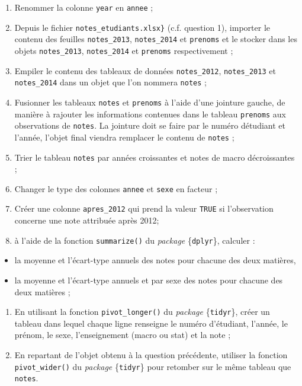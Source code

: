 \documentclass[
  11pt,
]{book}
\makeatletter
\providecommand{\tightlist}{%
  \setlength{\itemsep}{0pt}\setlength{\parskip}{0pt}}
\numberwithin{equation}{section}
\numberwithin{countremarque}{section}
\newenvironment{exframe}{%
 \def\at@end@of@exframe{}%
 \ifinner\ifhmode%
  \def\at@end@of@exframe{\end{minipage}}%
  \begin{minipage}{\columnwidth}%
 \fi\fi%
 \def\FrameCommand##1{\hskip\@totalleftmargin \hskip-\fboxsep
 \colorbox{shadecolorex}{##1}\hskip-\fboxsep
     \hskip-\linewidth \hskip-\@totalleftmargin \hskip\columnwidth}%
 \MakeFramed {\advance\hsize-\width
   \@totalleftmargin\z@ \linewidth\hsize
   \@setminipage}}%
 {\par\unskip\endMakeFramed%
 \at@end@of@exframe}
\makeatother
\begin{document}
\begin{exframe}
\begin{enumerate}
\def\labelenumi{\arabic{enumi}.}
\setcounter{enumi}{9}
\tightlist
\item
  Renommer la colonne \texttt{year} en \texttt{annee} ;
\item
  Depuis le fichier \texttt{notes\_etudiants.xlsx\}} (c.f. question 1), importer le contenu des feuilles \texttt{notes\_2013}, \texttt{notes\_2014} et \texttt{prenoms} et le stocker dans les objets \texttt{notes\_2013}, \texttt{notes\_2014} et \texttt{prenoms} respectivement ;
\item
  Empiler le contenu des tableaux de données \texttt{notes\_2012}, \texttt{notes\_2013} et \texttt{notes\_2014} dans un objet que l'on nommera \texttt{notes} ;
\item
  Fusionner les tableaux \texttt{notes} et \texttt{prenoms} à l'aide d'une jointure gauche, de manière à rajouter les informations contenues dans le tableau \texttt{prenoms} aux observations de \texttt{notes}. La jointure doit se faire par le numéro détudiant et l'année, l'objet final viendra remplacer le contenu de \texttt{notes} ;
\item
  Trier le tableau \texttt{notes} par années croissantes et notes de macro décroissantes ;
\item
  Changer le type des colonnes \texttt{annee} et \texttt{sexe} en facteur ;
\item
  Créer une colonne \texttt{apres\_2012} qui prend la valeur \texttt{TRUE} si l'observation concerne une note attribuée après 2012;
\item
  à l'aide de la fonction \texttt{summarize()} du \emph{package} \{\texttt{dplyr}\}, calculer :
\end{enumerate}

\begin{itemize}
\tightlist
\item
  la moyenne et l'écart-type annuels des notes pour chacune des deux matières,
\item
  la moyenne et l'écart-type annuels et par sexe des notes pour chacune des deux matières ;
\end{itemize}

\begin{enumerate}
\def\labelenumi{\arabic{enumi}.}
\setcounter{enumi}{16}
\tightlist
\item
  En utilisant la fonction \texttt{pivot\_longer()} du \emph{package} \{\texttt{tidyr}\}, créer un tableau dans lequel chaque ligne renseigne le numéro d'étudiant, l'année, le prénom, le sexe, l'enseignement (macro ou stat) et la note ;
\item
  En repartant de l'objet obtenu à la question précédente, utiliser la fonction \texttt{pivot\_wider()} du \emph{package} \{\texttt{tidyr}\} pour retomber sur le même tableau que \texttt{notes}.
\end{enumerate}
\end{exframe}
\end{document}
